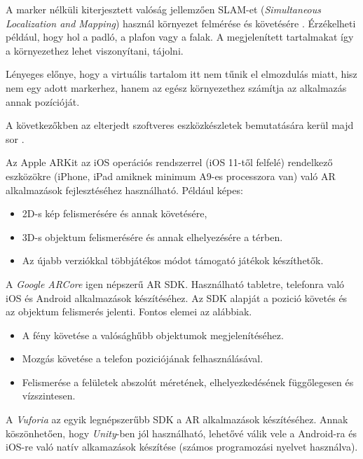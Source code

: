 
A marker nélküli kiterjesztett valóság jellemzően SLAM-et (\textit{Simultaneous Localization and Mapping}) használ környezet felmérése és követésére \cite{stachniss2016simultaneous}.
Érzékelheti például, hogy hol a padló, a plafon vagy a falak.
A megjelenített tartalmakat így a környezethez lehet viszonyítani, tájolni.

Lényeges előnye, hogy a virtuális tartalom itt nem tűnik el elmozdulás miatt, hisz nem egy adott markerhez,
hanem az egész környezethez számítja az alkalmazás annak pozícióját.


A következőkben az elterjedt szoftveres eszközkészletek bemutatására kerül majd sor \cite{hanafi2019comparative}.


Az Apple ARKit az iOS operációs rendszerrel (iOS 11-től felfelé) rendelkező eszközökre (iPhone, iPad amiknek minimum A9-es processzora van) való AR alkalmazások fejlesztéséhez használható. 
Például képes: 
\begin{itemize}
\item 2D-s kép felismerésére és annak követésére,
\item 3D-s objektum felismerésére és annak elhelyezésére a térben.
\item Az újabb verziókkal többjátékos módot támogató játékok készíthetők. 
\end{itemize}


A \textit{Google ARCore} igen népszerű AR SDK. Használható tabletre, telefonra való iOS és Android alkalmazások készítéséhez. Az SDK alapját a pozició követés és az objektum felismerés jelenti.
Fontos elemei az alábbiak.
\begin{itemize}
\item A fény követése a valósághűbb objektumok megjelenítéséhez.
\item Mozgás követése a telefon poziciójának felhasználásával.
\item Felismerése a felületek abszolút méretének, elhelyezkedésének függőlegesen és vízszintesen.
\end{itemize}


A \textit{Vuforia} az egyik legnépszerűbb SDK a AR alkalmazások készítéséhez.
Annak köszönhetően, hogy \textit{Unity}-ben jól használható, lehetővé válik vele a Android-ra és iOS-re való natív alkamazások készítése (számos programozási nyelvet használva).


